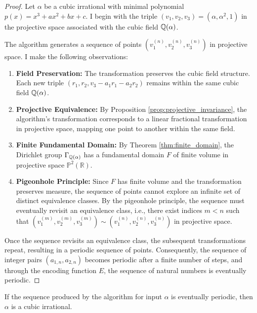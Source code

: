 \begin{proof}
Let $\alpha$ be a cubic irrational with minimal polynomial $p(x) = x^3 + ax^2 + bx + c$. I begin with the triple $(v_1, v_2, v_3) = (\alpha, \alpha^2, 1)$ in the projective space associated with the cubic field $\mathbb{Q}(\alpha)$.

The \HAPD{} algorithm generates a sequence of points $(v_1^{(n)}, v_2^{(n)}, v_3^{(n)})$ in projective space. I make the following observations:

\begin{enumerate}
    \item \textbf{Field Preservation:} The \HAPD{} transformation preserves the cubic field structure. Each new triple $(r_1, r_2, v_3 - a_1r_1 - a_2r_2)$ remains within the same cubic field $\mathbb{Q}(\alpha)$.
    
    \item \textbf{Projective Equivalence:} By Proposition \ref{prop:projective_invariance}, the algorithm's transformation corresponds to a linear fractional transformation in projective space, mapping one point to another within the same field.
    
    \item \textbf{Finite Fundamental Domain:} By Theorem \ref{thm:finite_domain}, the Dirichlet group $\Gamma_{\mathbb{Q}(\alpha)}$ has a fundamental domain $F$ of finite volume in projective space $\mathbb{P}^2(\mathbb{R})$.
    
    \item \textbf{Pigeonhole Principle:} Since $F$ has finite volume and the transformation preserves measure, the sequence of points cannot explore an infinite set of distinct equivalence classes. By the pigeonhole principle, the sequence must eventually revisit an equivalence class, i.e., there exist indices $m < n$ such that $(v_1^{(m)}, v_2^{(m)}, v_3^{(m)}) \sim (v_1^{(n)}, v_2^{(n)}, v_3^{(n)})$ in projective space.
\end{enumerate}

Once the sequence revisits an equivalence class, the subsequent transformations repeat, resulting in a periodic sequence of points. Consequently, the sequence of integer pairs $(a_{1,n}, a_{2,n})$ becomes periodic after a finite number of steps, and through the encoding function $E$, the sequence of natural numbers is eventually periodic.
\end{proof}

\begin{theorem}\label{thm:only_cubic_periodic}
If the sequence produced by the \HAPD{} algorithm for input $\alpha$ is eventually periodic, then $\alpha$ is a cubic irrational.
\end{theorem}

